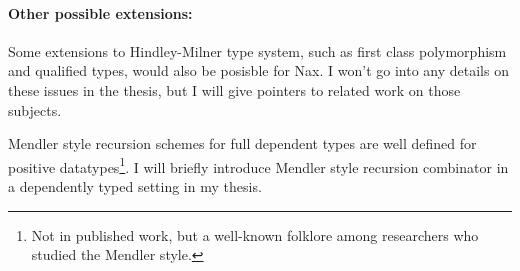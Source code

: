 \paragraph{Other possible extensions:}
Some extensions to Hindley-Milner type system, such as first class polymorphism
and qualified types, would also be posisble for Nax. I won't go into any
details on these issues in the thesis, but I will give pointers to related work
on those subjects.

Mendler style recursion schemes for full dependent types are well defined for
positive datatypes\footnote{Not in published work, but a well-known folklore
among researchers who studied the Mendler style.}. I will briefly introduce
Mendler style recursion combinator in a dependently typed setting in my thesis.

